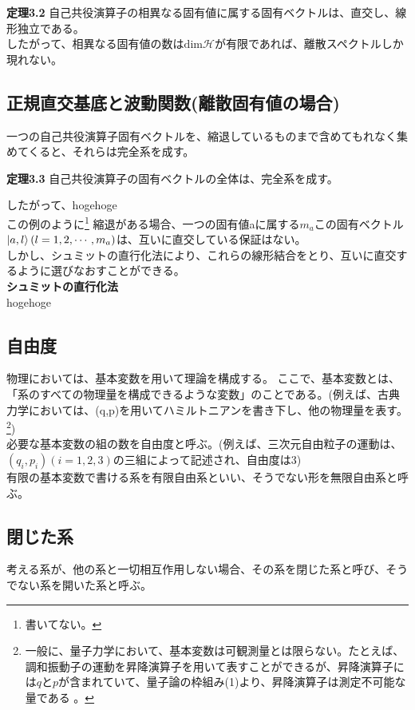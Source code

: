 \documentclass[a4paper,11pt]{jsarticle}
\begin{document}
\begin{itembox}[l]{\textbf {定理3.2}}
自己共役演算子の相異なる固有値に属する固有ベクトルは、直交し、線形独立である。\\
したがって、相異なる固有値の数は$\mathrm{dim}\mathcal{H}$が有限であれば、離散スペクトルしか現れない。
\end{itembox}
\subsection{正規直交基底と波動関数(離散固有値の場合)}
一つの自己共役演算子固有ベクトルを、縮退しているものまで含めてもれなく集めてくると、それらは完全系を成す。
\begin{itembox}[l]{\textbf {定理3.3}}
自己共役演算子の固有ベクトルの全体は、完全系を成す。
\end{itembox}
したがって、hogehoge
\\
この例のように\footnote{書いてない。}
縮退がある場合、一つの固有値aに属する$m_a$この固有ベクトル$\ket{a,l}(l=1,2,\cdots,m_a)$は、互いに直交している保証はない。\\
しかし、シュミットの直行化法により、これらの線形結合をとり、互いに直交するように選びなおすことができる。\\
\textbf{シュミットの直行化法}\\
hogehoge

\subsection{自由度}
物理においては、基本変数を用いて理論を構成する。
ここで、基本変数とは、「系のすべての物理量を構成できるような変数」のことである。(例えば、古典力学においては、(q,p)を用いてハミルトニアンを書き下し、他の物理量を表す。\footnote{一般に、量子力学において、基本変数は可観測量とは限らない。たとえば、調和振動子の運動を昇降演算子を用いて表すことができるが、昇降演算子には$q$と$p$が含まれていて、量子論の枠組み(1)より、昇降演算子は測定不可能な量である
。})\\
必要な基本変数の組の数を自由度と呼ぶ。(例えば、三次元自由粒子の運動は、$(q_i,p_i)(i=1,2,3)$の三組によって記述され、自由度は3)\\
有限の基本変数で書ける系を有限自由系といい、そうでない形を無限自由系と呼ぶ。\\

\subsection{閉じた系}
考える系が、他の系と一切相互作用しない場合、その系を閉じた系と呼び、そうでない系を開いた系と呼ぶ。\\
\end{document}
